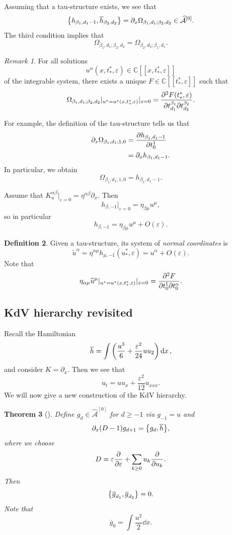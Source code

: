 \documentclass[leqno, openany]{memoir}
\newtheorem{thm}{Theorem}[section]
\theoremstyle{definition}
\newtheorem{defn}[thm]{Definition}
\theoremstyle{remark}
\newtheorem{rmk}[thm]{Remark}
\theoremstyle{plain}
\theoremstyle{definition}
\theoremstyle{remark}
\newcommand{\C}{\mathbb{C}}
\newcommand{\ep}{\varepsilon}
\newcommand{\mc}[1]{\mathcal{#1}}
\newcommand{\ol}[1]{\overline{#1}}
\newcommand{\wt}[1]{\widetilde{#1}}
\newcommand{\wh}[1]{\widehat{#1}}
\begin{document}
Assuming that a tau-structure exists, we see that
\[ \qty{h_{\beta_1, d_1-1}, \ol{h}_{\beta_2, d_2}} = \partial_x \Omega_{\beta_1, d_1; \beta_2, d_2} \in \wh{\mc{A}}^{[0]}. \]
The third condition implies that
\[ \Omega_{\beta_1, d_1; \beta_2, d_2} = \Omega_{\beta_2, d_2; \beta_1, d_1}. \]

\begin{rmk}
    For all solutions
    \[ u^{\alpha}(x, t_*^*, \ep) \in \C[[x, t_*^*, \ep]] \]
    of the integrable system, there exists a unique $F \in \C[[t_*^*, \ep]]$ such that
    \[ \Omega_{\beta_1, d_1; \beta_2, d_2} |_{u^*=u^*(x, t_*^*, \ep)} |_{x=0} = \pdv{F(t_*^*, \ep)}{t_{d_1}^{\beta_1}}{t_{d_2}^{\beta_2}}. \]
\end{rmk}

For example, the definition of the tau-structure tells us that
\begin{align*} 
    \partial_x \Omega_{\beta_1, d_1; 1, 0} &= \pdv{h_{\beta_1, d_1-1}}{t_0^1} \\
    &= \partial_x h_{\beta_1, d_1-1}.
\end{align*}
In particular, we obtain
\[ \Omega_{\beta_1, d_1; 1, 0} = h_{\beta_1, d_1-1}. \]

Assume that $K_u^{\alpha\beta}|_{\ep = 0} = \eta^{\alpha\beta} \partial_x$. Then
\[ h_{\beta, -1} |_{\ep = 0} = \eta_{\beta \mu} u^{\mu}, \]
so in particular
\[ h_{\beta, -1} = \eta_{\beta \mu} u^{\mu} + O(\ep). \]

\begin{defn}
    Given a tau-structure, its system of \textit{normal coordinates} is
    \[ \wt{u}^{\alpha} = \eta^{\alpha \mu} h_{\mu, -1}(u_*^*, \ep) = u^{\alpha} + O(\ep). \]
    Note that
    \[ \eta_{\alpha\mu} \wt{u}^{\mu} |_{u^*=u^*(x,t_*^*,\ep)} |_{x=0} = \pdv{F}{t_0^1}{t_0^{\alpha}}. \]
\end{defn}

\subsection{KdV hierarchy revisited}

Recall the Hamiltonian
\[ \ol{h} = \int \qty(\frac{u^3}{6} + \frac{\ep^2}{24} uu_2) \dd{x}, \]
and consider $K = \partial_x$. Then we see that
\[ u_t = u u_x + \frac{\ep^2}{12} u_{x x x}. \]
We will now give a new construction of the KdV hierarchy.

\begin{thm}[\cite{recdrhierarchy}]
    Define $g_d \in \wh{\mc{A}}^{[0]}$ for $d \geq -1$ via $g_{-1} = u$ and
    \[ \partial_x (D-1) g_{d+1} = \qty{g_d, \ol{h}}, \]
    where we choose
    \[ D = \ep \pdv{\ep} + \sum_{k \geq 0} u_k \pdv{u_k}. \]
    Then
    \[ \qty{\ol{g}_{d_1}, \ol{g}_{d_2}} = 0. \]
    Note that
    \[ \ol{g}_0 = \int \frac{u^2}{2} \dd{x}. \]
\end{thm}
\end{document}
